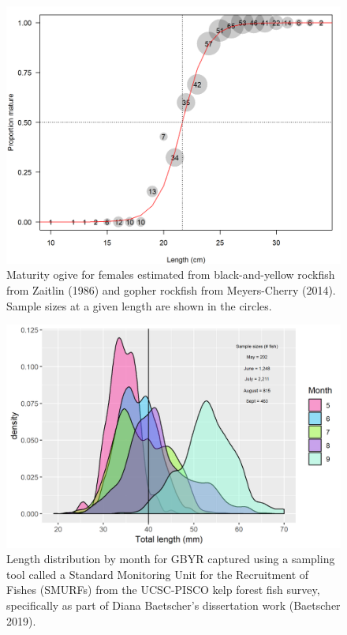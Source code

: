 \documentclass[12pt,]{article}
\begin{document}
\begin{figure}
\centering
\includegraphics{Figures/GBY_maturity_ogive.png}
\caption{Maturity ogive for females estimated from black-and-yellow
rockfish from Zaitlin (1986) and gopher rockfish from Meyers-Cherry
(2014). Sample sizes at a given length are shown in the circles.
\label{fig:GBY_maturity_ogive}}
\end{figure}

\FloatBarrier

\FloatBarrier

\begin{figure}
\centering
\includegraphics{Figures/SMURF_lengths.png}
\caption{Length distribution by month for GBYR captured using a sampling
tool called a Standard Monitoring Unit for the Recruitment of Fishes
(SMURFs) from the UCSC-PISCO kelp forest fish survey, specifically as
part of Diana Baetscher's dissertation work (Baetscher 2019).
\label{fig:SMURF_lengths}}
\end{figure}
\end{document}
